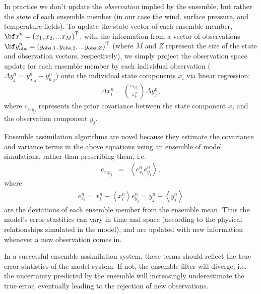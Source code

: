 In practice we don't update the \textit{observation} implied by the ensemble, but rather the \textit{state} of each ensemble member (in our case the wind, surface pressure, and temperature fields). 
To update the state vector of each ensemble member, ${\bf x}^n = \left(x_1,x_2,...x_M  \right)^{\text{T}}$, with the information from a vector of observations ${\bf y}_{\text{obs}}^n = \left(y_{\text{obs},1},y_{\text{obs},2},...y_{\text{obs},Z}  \right)^{\text{T}}$ (where $M$ and $Z$ represent the size of the state and observation vectors, respectively), we simply project the observation space update for each ensemble member by each individual observation ($\Delta y^n_j = y_{a,j}^n-y_{b,j}^n$) onto the individual state components $x_i$ via linear regression:
\begin{eqnarray}
 \Delta x_{i}^n = 
\left(
\frac{c_{x_iy_j}}{\sigma_b^2}
\right)
\Delta y^n_j,
\label{eq:state_update}
\end{eqnarray}
where $c_{x_iy_j}$ represents the prior covariance between the state component $x_i$ and the observation component $y_j$.


Ensemble assimilation algorithms are novel because they estimate the covariance and variance terms in the above equations using an ensemble of model simulations, rather than prescribing them, i.e. 
\begin{eqnarray}
c_{x_iy_j} &=& 
\left<
e_{x_i}^n 
e_{y_j}^n
\right>,
\label{eq:covariance} 
\end{eqnarray}
%
%
%
where 
\begin{eqnarray}
	e_{x_i}^n = x_i^n - \left< x_i^n \right>   \label{eq:exn}
	e_{y_j}^n = y_j^n - \left< y_j^n \right>    \label{eq:eyn}
\end{eqnarray}
are the deviations of each ensemble member from the ensemble mean.
Thus the model's error stastitics can vary in time and space (according to the physical relationships simulated in the model), and are updated with new information whenever a new observation comes in.  

In a successful ensemble assimilation system, these terms should reflect the true error statistics of the model system.
If not, the ensemble filter will diverge, i.e. the uncertainty predicted by the ensemble will increasingly underestimate the true error, eventually leading to the rejection of new observations.

